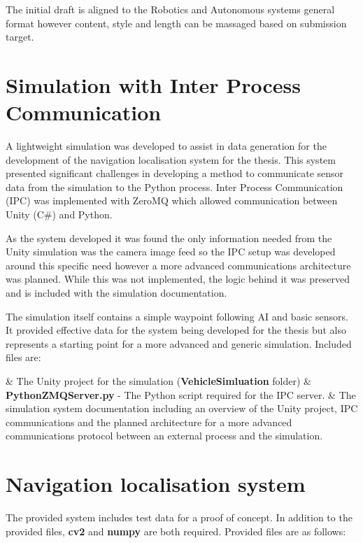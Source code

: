 \documentclass{article}
\begin{document}
The initial draft is aligned to the Robotics and Autonomous systems general format however content, style and length can be massaged based on submission target.

\section{Simulation with Inter Process Communication}

A lightweight simulation was developed to assist in data generation for the development of the navigation localisation system for the thesis. This system presented significant challenges in developing a method to communicate sensor data from the simulation to the Python process. Inter Process Communication (IPC) was implemented with ZeroMQ which allowed communication between Unity (C\#) and Python. 

As the system developed it was found the only information needed from the Unity simulation was the camera image feed so the IPC setup was developed around this specific need however a more advanced communications architecture was planned. While this was not implemented, the logic behind it was preserved and is included with the simulation documentation. 

The simulation itself contains a simple waypoint following AI and basic sensors. It provided effective data for the system being developed for the thesis but also represents a starting point for a more advanced and generic simulation. Included files are:

\begin{easylist}
	& The Unity project for the simulation (\textbf{VehicleSimluation} folder)
	& \textbf{PythonZMQServer.py} - The Python script required for the IPC server.
	& The simulation system documentation including an overview of the Unity project, IPC communications and the planned architecture for a more advanced communications protocol between an external process and the simulation.
\end{easylist}

\section{Navigation localisation system}

The provided system includes test data for a proof of concept. In addition to the provided files, \textbf{cv2} and \textbf{numpy} are both required. Provided files are as follows:
\end{document}
